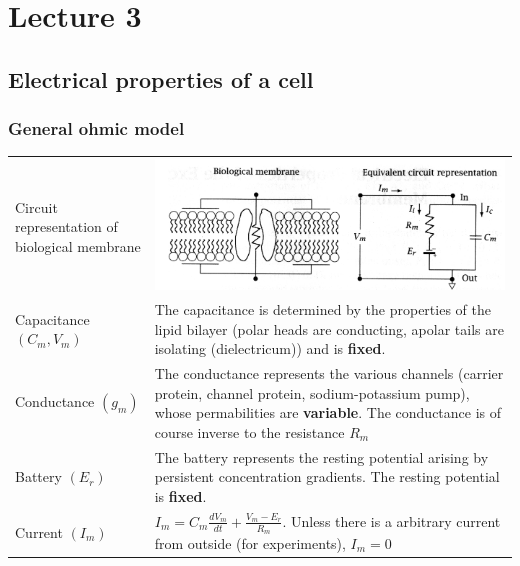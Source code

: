 \section{Lecture 3}
\subsection{Electrical properties of a cell}
\subsubsection{General ohmic model}
\begin{tabular}{p{4cm}p{15cm}}
Circuit representation of biological membrane	& \includegraphics[width = 14cm]{neuroinf_biomembrane_as_circuit.png}\\
Capacitance $(C_m, V_m)$	& The capacitance is determined by the properties of the lipid bilayer (polar heads are conducting, apolar tails are isolating (dielectricum)) and is \textbf{fixed}.\\
Conductance $(g_m)$	& The conductance represents the various channels (carrier protein, channel protein, sodium-potassium pump), whose permabilities are \textbf{variable}. The conductance is of course inverse to the resistance $R_m$\\
Battery $(E_r)$		& The battery represents the resting potential arising by persistent concentration gradients. The resting potential is \textbf{fixed}.\\
Current $(I_m)$		& $I_m = C_m \frac{dV_m}{dt} + \frac{V_m-E_r}{R_m}$. Unless there is a arbitrary current from outside (for experiments), $I_m = 0$
\end{tabular}
